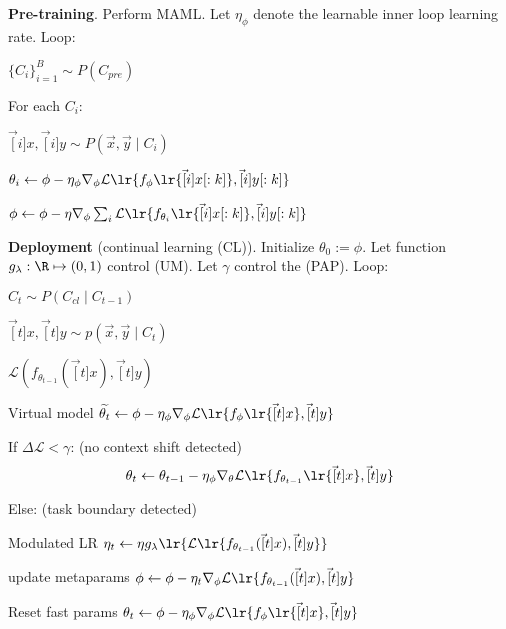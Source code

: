 \documentclass[11pt]{article}
\begin{document}
\begin{algorithm}
	\textbf{Pre-training}. Perform MAML. Let $\eta_{\phi}$ denote the learnable inner loop learning rate. Loop:
	\begin{compactenum}
		\item $\{C_i\}_{i=1}^B \sim P(C_{pre})$
		\item For each $C_i$: 
		\begin{compactenum}
			\item $\vec[i]{x}, \vec[i]{y} \sim P(\vec x, \vec y \mid C_i)$
			\item $\theta_i \leftarrow \phi  - \eta_{\phi} \nabla_{\phi} \mathcal L \lr{   f_{\phi}\lr{  \vec[i]{x}[:k]  } ,  \vec[i]{y}[:k]     }$
		\end{compactenum}
		\item $\phi \leftarrow \phi - \eta \nabla_{\phi} \sum_i \mathcal L  \lr{   f_{\theta_i}\lr{  \vec[i]{x}[:k]  } ,  \vec[i]{y}[:k]     }$
	\end{compactenum}

	\vspace{1em}
	\textbf{Deployment} (continual learning (CL)). Initialize $\theta_0 := \phi$. Let function $g_{\lambda} : \R \mapsto (0, 1)$ control  (UM). Let $\gamma$ control the  (PAP). Loop:
	\begin{compactenum}
		\item $C_t \sim P(C_{cl} \mid C_{t-1})$
		\item $\vec[t]{x}, \vec[t]{y} \sim p(\vec x, \vec y \mid C_t)$
		\item $\mathcal L(f_{\theta_{t-1}}(\vec[t]{x}), \vec[t]{y})$
		\item Virtual model $\widetilde{\theta_t} \leftarrow \phi  - \eta_{\phi} \nabla_{\phi} \mathcal L \lr{   f_{\phi}\lr{  \vec[t]{x}  } ,  \vec[t]{y}   }$
		\item If $\Delta \mathcal L < \gamma$: (no context shift detected)
			$$  \theta_t \leftarrow \theta_{t-1} - \eta_{\phi} \nabla_{\theta} \mathcal L \lr{   f_{\theta_{t-1}}\lr{  \vec[t]{x}  } ,  \vec[t]{y}   }$$ 
		\item Else: (task boundary detected)
		\begin{compactenum}
			\item Modulated LR $\eta_t \leftarrow \eta g_{\lambda}\lr{     \mathcal L \lr{     f_{\theta_{t-1}}(\vec[t]{x}) , \vec[t]{y} }  }$ 
			\item update metaparams $\phi \leftarrow \phi - \eta_t \nabla_{\phi} \mathcal L \lr{     f_{\theta_{t-1}}(\vec[t]{x}) , \vec[t]{y} } $
			\item Reset fast params $\theta_t \leftarrow \phi - \eta_{\phi} \nabla_{\phi}  \mathcal L \lr{   f_{\phi}\lr{  \vec[t]{x}  } ,  \vec[t]{y}   }$
		\end{compactenum}
	\end{compactenum}
\end{algorithm}
\end{document}
